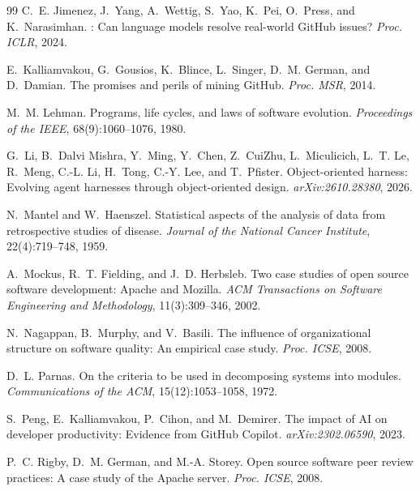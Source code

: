 \documentclass[sigconf,review]{acmart}
\begin{document}
\begin{thebibliography}{99}
C.~E. Jimenez, J.~Yang, A.~Wettig, S.~Yao, K.~Pei, O.~Press, and K.~Narasimhan.
: Can language models resolve real-world {GitHub} issues?
\newblock \emph{Proc. ICLR}, 2024.

E.~Kalliamvakou, G.~Gousios, K.~Blince, L.~Singer, D.~M. German, and D.~Damian.
\newblock The promises and perils of mining {GitHub}.
\newblock \emph{Proc. MSR}, 2014.

M.~M. Lehman.
\newblock Programs, life cycles, and laws of software evolution.
\newblock \emph{Proceedings of the IEEE}, 68(9):1060--1076, 1980.

G.~Li, B.~Dalvi Mishra, Y.~Ming, Y.~Chen, Z.~CuiZhu, L.~Miculicich, L.~T. Le, R.~Meng, C.-L. Li, H.~Tong, C.-Y. Lee, and T.~Pfister.
\newblock Object-oriented harness: Evolving agent harnesses through object-oriented design.
\newblock \emph{arXiv:2610.28380}, 2026.

N.~Mantel and W.~Haenszel.
\newblock Statistical aspects of the analysis of data from retrospective studies of disease.
\newblock \emph{Journal of the National Cancer Institute}, 22(4):719--748, 1959.

A.~Mockus, R.~T. Fielding, and J.~D. Herbsleb.
\newblock Two case studies of open source software development: {Apache} and {Mozilla}.
\newblock \emph{ACM Transactions on Software Engineering and Methodology}, 11(3):309--346, 2002.

N.~Nagappan, B.~Murphy, and V.~Basili.
\newblock The influence of organizational structure on software quality: An empirical case study.
\newblock \emph{Proc. ICSE}, 2008.

D.~L. Parnas.
\newblock On the criteria to be used in decomposing systems into modules.
\newblock \emph{Communications of the ACM}, 15(12):1053--1058, 1972.

S.~Peng, E.~Kalliamvakou, P.~Cihon, and M.~Demirer.
\newblock The impact of {AI} on developer productivity: Evidence from {GitHub Copilot}.
\newblock \emph{arXiv:2302.06590}, 2023.

P.~C. Rigby, D.~M. German, and M.-A. Storey.
\newblock Open source software peer review practices: A case study of the {Apache} server.
\newblock \emph{Proc. ICSE}, 2008.


\end{thebibliography}
\end{document}
